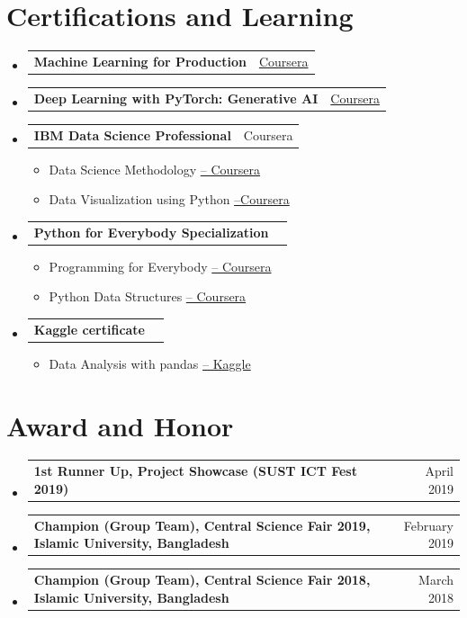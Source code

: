 \documentclass[10pt, a4paper]{article}
\makeatletter
\newcommand{\resumeItem}[1]{
  \item\small{
    {#1 \vspace{-2pt}}
  }
}
\newcommand{\resumeProjectHeading}[2]{
    \item
    \begin{tabular*}{\linewidth}{@{}l@{\extracolsep{\fill}}r@{}}
      \small#1 & \small#2 \\
    \end{tabular*}\vspace{-7pt}
}
\makeatother
\begin{document}
\section{Certifications and Learning}
\begin{itemize}[leftmargin=0.02in, label={}]
    \resumeProjectHeading
      {\textbf{Machine Learning for Production}}{\href{https://coursera.org/share/f46c9a7332b1c706c44aa0bc2ce5a5d5}{Coursera}}
    \resumeProjectHeading
      {\textbf{Deep Learning with PyTorch: Generative AI}}{\href{https://www.coursera.org/account/accomplishments/verify/BHA85EQXC2SG}{Coursera}}
    \resumeProjectHeading
      {\textbf{IBM Data Science Professional}}{Coursera}
      \begin{itemize}
          \resumeItem{Data Science Methodology}{\href{https://www.credly.com/badges/66ef62ba-78cb-4a95-acef-e32e1e08aad4/linked_in_profile}{-- Coursera}}
          \resumeItem{Data Visualization using Python}{\href{https://www.coursera.org/account/accomplishments/verify/RKMQBZAH6DVH?utm_source=link&utm_medium=certificate&utm_content=cert_image&utm_campaign=sharing_cta&utm_product=course}{--Coursera}}
      \end{itemize}
    \resumeProjectHeading
      {\textbf{Python for Everybody Specialization}}{}
      \begin{itemize}
        \resumeItem{Programming for Everybody \href{https://www.coursera.org/account/accomplishments/verify/RKMQBZAH6DVH?utm_source=link&utm_medium=certificate&utm_content=cert_image&utm_campaign=sharing_cta&utm_product=course}{-- Coursera}}
        \resumeItem{Python Data Structures \href{https://www.coursera.org/account/accomplishments/verify/45KYJRYA83D7?utm_source=link&utm_medium=certificate&utm_content=cert_image&utm_campaign=sharing_cta&utm_product=course}{-- Coursera}}
      \end{itemize}
    \resumeProjectHeading
      {\textbf{Kaggle certificate}}{}
      \begin{itemize}
        \resumeItem{Data Analysis with pandas \href{https://www.kaggle.com/learn/certification/mahfuzraihan/pandas}{-- Kaggle}}
      \end{itemize}
\end{itemize}
\section{Award and Honor}
\begin{itemize}[leftmargin=0.02in, label={}]
    \resumeProjectHeading
      {\textbf{1st Runner Up, Project Showcase (SUST ICT Fest 2019)}}{April 2019}
    \resumeProjectHeading
      {\textbf{Champion (Group Team), Central Science Fair 2019, Islamic University, Bangladesh}}{February 2019}
    \resumeProjectHeading
      {\textbf{Champion (Group Team), Central Science Fair 2018, Islamic University, Bangladesh}}{March 2018}
\end{itemize}
\end{document}
